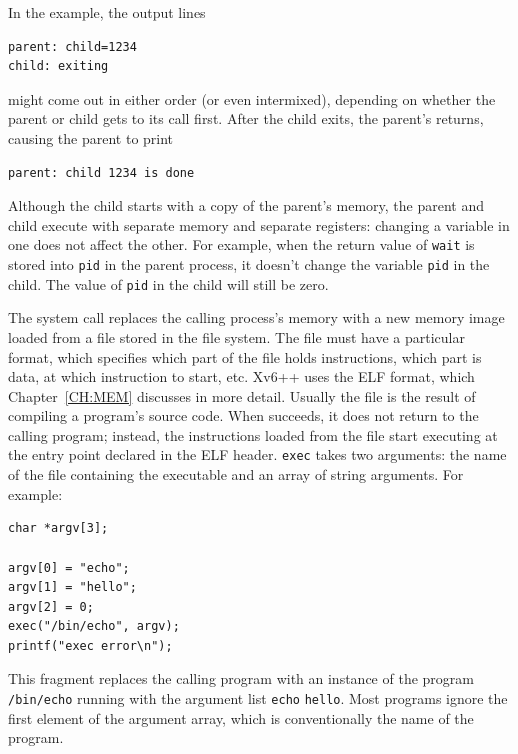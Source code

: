 In the example, the output lines
\begin{lstlisting}[]
parent: child=1234
child: exiting
\end{lstlisting}
might come out in either order (or even intermixed), depending on whether the
parent or child gets to its
call first.
After the child exits, the parent's
returns, causing the parent to print
\begin{lstlisting}[]
parent: child 1234 is done
\end{lstlisting}
Although the child starts with a copy of the parent's memory, the
parent and child execute with separate memory and separate registers:
changing a variable in one does not affect the other. For example, when the
return value of
\lstinline{wait}
is stored into
\lstinline{pid}
in the parent process,
it doesn't change the variable
\lstinline{pid}
in the child.  The value of
\lstinline{pid}
in the child will still be zero.

The
system call
replaces the calling process's memory with a new memory
image loaded from a file stored in the file system.
The file must have a particular format, which specifies which part of
the file holds instructions, which part is data, at which instruction
to start, etc. Xv6++
uses the ELF format, which Chapter~\ref{CH:MEM} discusses in
more detail.
Usually the file is the result of compiling a program's source code.
When
succeeds, it does not return to the calling program;
instead, the instructions loaded from the file start
executing at the entry point declared in the ELF header.
\lstinline{exec}
takes two arguments: the name of the file containing the
executable and an array of string arguments.
For example:
\begin{lstlisting}[]
char *argv[3];

argv[0] = "echo";
argv[1] = "hello";
argv[2] = 0;
exec("/bin/echo", argv);
printf("exec error\n");
\end{lstlisting}
This fragment replaces the calling program with an instance
of the program
\lstinline{/bin/echo}
running with the argument list
\lstinline{echo}
\lstinline{hello}.
Most programs ignore the first element of the argument array, which is
conventionally the name of the program.

